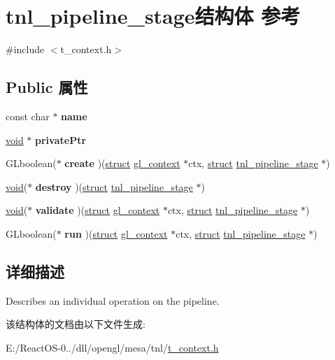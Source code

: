 \hypertarget{structtnl__pipeline__stage}{}\section{tnl\+\_\+pipeline\+\_\+stage结构体 参考}
\label{structtnl__pipeline__stage}


{\ttfamily \#include $<$t\+\_\+context.\+h$>$}

\subsection*{Public 属性}
\begin{DoxyCompactItemize}
\item 
\mbox{\label{structtnl__pipeline__stage_a2da4143545d7339960e6818d57613dab}} 
const char $\ast$ {\bfseries name}
\item 
\mbox{\label{structtnl__pipeline__stage_a312cfc59e532e9f5f82a41d535b2c7b4}} 
\hyperlink{interfacevoid}{void} $\ast$ {\bfseries private\+Ptr}
\item 
\mbox{\label{structtnl__pipeline__stage_aa2f567c13185c59a5b62c49220c38b1a}} 
G\+Lboolean($\ast$ {\bfseries create} )(\hyperlink{interfacestruct}{struct} \hyperlink{structgl__context}{gl\+\_\+context} $\ast$ctx, \hyperlink{interfacestruct}{struct} \hyperlink{structtnl__pipeline__stage}{tnl\+\_\+pipeline\+\_\+stage} $\ast$)
\item 
\mbox{\label{structtnl__pipeline__stage_a4c14abae92f275ec14f9f60c749afdb0}} 
\hyperlink{interfacevoid}{void}($\ast$ {\bfseries destroy} )(\hyperlink{interfacestruct}{struct} \hyperlink{structtnl__pipeline__stage}{tnl\+\_\+pipeline\+\_\+stage} $\ast$)
\item 
\mbox{\label{structtnl__pipeline__stage_a651ac5caec74a7ae42af17e297ca8b86}} 
\hyperlink{interfacevoid}{void}($\ast$ {\bfseries validate} )(\hyperlink{interfacestruct}{struct} \hyperlink{structgl__context}{gl\+\_\+context} $\ast$ctx, \hyperlink{interfacestruct}{struct} \hyperlink{structtnl__pipeline__stage}{tnl\+\_\+pipeline\+\_\+stage} $\ast$)
\item 
\mbox{\label{structtnl__pipeline__stage_afed716e53a5a88b81ef7e1997c42ac4d}} 
G\+Lboolean($\ast$ {\bfseries run} )(\hyperlink{interfacestruct}{struct} \hyperlink{structgl__context}{gl\+\_\+context} $\ast$ctx, \hyperlink{interfacestruct}{struct} \hyperlink{structtnl__pipeline__stage}{tnl\+\_\+pipeline\+\_\+stage} $\ast$)
\end{DoxyCompactItemize}


\subsection{详细描述}
Describes an individual operation on the pipeline. 

该结构体的文档由以下文件生成\+:\begin{DoxyCompactItemize}
\item 
E\+:/\+React\+O\+S-\/0../dll/opengl/mesa/tnl/\hyperlink{t__context_8h}{t\+\_\+context.\+h}\end{DoxyCompactItemize}
